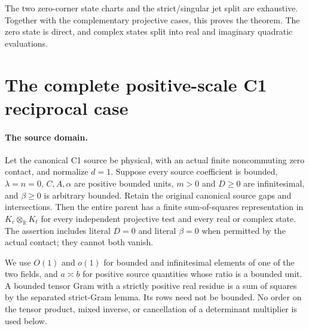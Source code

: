 The two zero-corner state charts and the strict/singular jet split
are exhaustive. Together with the complementary projective cases, this
proves the theorem. The zero state is direct, and complex states split
into real and imaginary quadratic evaluations.



\section{\texorpdfstring{The complete positive-scale C1 reciprocal case}{The complete positive-scale C1 reciprocal case}}
\label{component:p98f24864b071}

\label{p98f24864b071:sec:c1-reciprocal-rederived}

\paragraph{The source domain.}
Let the canonical C1 source be physical, with an actual finite
noncommuting zero contact, and normalize $d=1$. Suppose every source
coefficient is bounded, $\lambda=n=0$, $C,A,\alpha$ are positive
bounded units, $m>0$ and $D\geq0$ are infinitesimal, and
$\beta\geq0$ is arbitrary bounded. Retain the original canonical
source gaps and intersections. Then the entire parent has a finite
sum-of-squares representation in $K_c\otimes_{\mathbb R}K_t$ for
every independent projective test and every real or complex state.
The assertion includes literal $D=0$ and literal $\beta=0$ when
permitted by the actual contact; they cannot both vanish.

We use $O(1)$ and $o(1)$ for bounded and infinitesimal elements of
one of the two fields, and $a\asymp b$ for positive source quantities
whose ratio is a bounded unit. A bounded tensor Gram with a strictly
positive real residue is a sum of squares by the separated strict-Gram lemma. Its rows need not be bounded. No order on the tensor
product, mixed inverse, or cancellation of a determinant multiplier is
used below.

